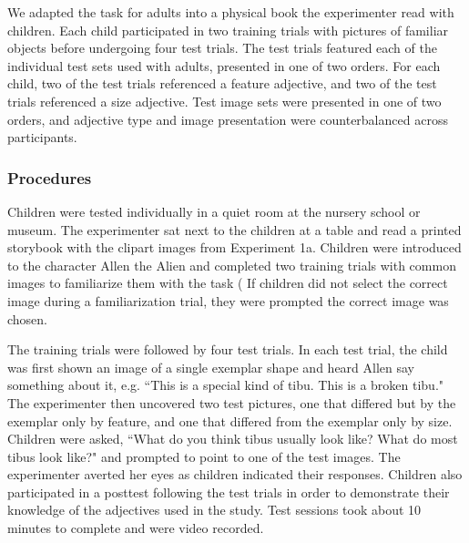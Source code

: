 \documentclass[10pt,letterpaper]{article}
\begin{document}
We adapted the task for adults into a physical book the experimenter read with children.  Each child participated in two training trials with pictures of familiar objects before undergoing four test trials.  The test trials featured each of the individual test sets used with adults, presented in one of two orders.  For each child, two of the test trials referenced a feature adjective, and two of the test trials referenced a size adjective.  Test image sets were presented in one of two orders, and adjective type and image presentation were counterbalanced across participants. 


\subsubsection{Procedures}

Children were tested individually in a quiet room at the nursery school or museum.  The experimenter sat next to the children at a table and read a printed storybook with the clipart images from Experiment 1a. Children were introduced to the character Allen the Alien and completed two training trials with common images to familiarize them with the task (%
If children did not select the correct image during a familiarization trial, they were prompted the correct image was chosen.

The training trials were followed by four test trials.  In each test trial, the child was first shown an image of a single exemplar shape and heard Allen say something about it, e.g. ``This is a special kind of tibu. This is a broken tibu."  The experimenter then uncovered two test pictures, one that differed but by the exemplar only by feature, and one that differed from the exemplar only by size.  Children were asked, ``What do you think tibus usually look like? What do most tibus look like?" and prompted to point to one of the test images.  The experimenter averted her eyes as children indicated their responses. 
Children also participated in a posttest following the test trials in order to demonstrate their knowledge of the adjectives used in the study.  Test sessions took about 10 minutes to complete and were video recorded.  
\end{document}
